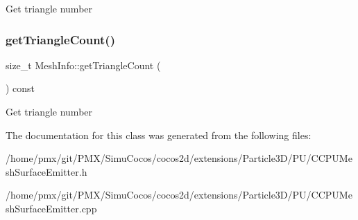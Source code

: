 Get triangle number \mbox{\label{classMeshInfo_a5e2ff519d1987d26101a6e40527a9571}} 
\subsubsection{\texorpdfstring{get\+Triangle\+Count()}{getTriangleCount()}\hspace{0.1cm}{\footnotesize\ttfamily [2/2]}}
{\footnotesize\ttfamily size\+\_\+t Mesh\+Info\+::get\+Triangle\+Count (\begin{DoxyParamCaption}{ }\end{DoxyParamCaption}) const\hspace{0.3cm}{\ttfamily [inline]}}

Get triangle number 

The documentation for this class was generated from the following files\+:\begin{DoxyCompactItemize}
\item 
/home/pmx/git/\+P\+M\+X/\+Simu\+Cocos/cocos2d/extensions/\+Particle3\+D/\+P\+U/C\+C\+P\+U\+Mesh\+Surface\+Emitter.\+h\item 
/home/pmx/git/\+P\+M\+X/\+Simu\+Cocos/cocos2d/extensions/\+Particle3\+D/\+P\+U/C\+C\+P\+U\+Mesh\+Surface\+Emitter.\+cpp\end{DoxyCompactItemize}
